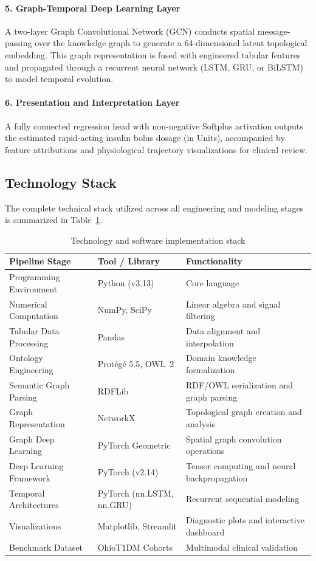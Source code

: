 \documentclass[10pt,a4paper]{article}
\begin{document}
\paragraph{5. Graph-Temporal Deep Learning Layer}
A two-layer Graph Convolutional Network (GCN) conducts spatial message-passing over the knowledge graph to generate a 64-dimensional latent topological embedding. This graph representation is fused with engineered tabular features and propagated through a recurrent neural network (LSTM, GRU, or BiLSTM) to model temporal evolution.

\paragraph{6. Presentation and Interpretation Layer}
A fully connected regression head with non-negative Softplus activation outputs the estimated rapid-acting insulin bolus dosage (in Units), accompanied by feature attributions and physiological trajectory visualizations for clinical review.

\subsection{Technology Stack}
The complete technical stack utilized across all engineering and modeling stages is summarized in Table~\ref{tab:stack}.

\begin{table}[htbp]
\caption{Technology and software implementation stack}\label{tab:stack}
\small
\begin{tabular*}{\textwidth}{@{\extracolsep{\fill}}lll@{}}
\toprule
Pipeline Stage & Tool / Library & Functionality \\
\midrule
Programming Environment & Python (v3.13) & Core language \\
Numerical Computation & NumPy, SciPy & Linear algebra and signal filtering \\
Tabular Data Processing & Pandas & Data alignment and interpolation \\
Ontology Engineering & Prot\'eg\'e 5.5, OWL~2 & Domain knowledge formalization \\
Semantic Graph Parsing & RDFLib & RDF/OWL serialization and graph parsing \\
Graph Representation & NetworkX & Topological graph creation and analysis \\
Graph Deep Learning & PyTorch Geometric \cite{fey2019} & Spatial graph convolution operations \\
Deep Learning Framework & PyTorch (v2.14) & Tensor computing and neural backpropagation \\
Temporal Architectures & PyTorch (nn.LSTM, nn.GRU) & Recurrent sequential modeling \\
Visualizations & Matplotlib, Streamlit & Diagnostic plots and interactive dashboard \\
Benchmark Dataset & OhioT1DM Cohorts \cite{marling2018, marling2020} & Multimodal clinical validation \\
\bottomrule
\end{tabular*}
\end{table}
\end{document}
